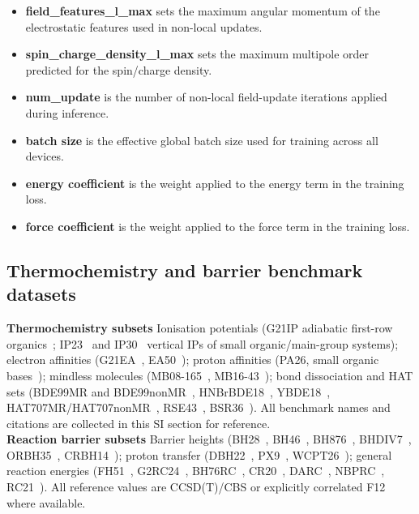 \documentclass[aps,%
superscriptaddress,
 amsmath,amssymb,
floatfix,
twocolumn
]{revtex4-2}
\begin{document}
\begin{itemize}
  \item \textbf{field\_features\_l\_max} sets the maximum angular momentum of the electrostatic features used in non-local updates.
  \item \textbf{spin\_charge\_density\_l\_max} sets the maximum multipole order predicted for the spin/charge density.
  \item \textbf{num\_update} is the number of non-local field-update iterations applied during inference.
  \item \textbf{batch size} is the effective global batch size used for training across all devices.
  \item \textbf{energy coefficient} is the weight applied to the energy term in the training loss.
  \item \textbf{force coefficient} is the weight applied to the force term in the training loss.
\end{itemize}
\subsection{Thermochemistry and barrier benchmark datasets}
\label{sec:tc_benchmarks}
\textbf{Thermochemistry subsets}  Ionisation potentials (G21IP adiabatic first-row organics~\cite{Parthiban2001}; IP23~\cite{Cheng2007} and IP30~\cite{Luo2012} vertical IPs of small organic/main-group systems); electron affinities (G21EA~\cite{Parthiban2001}, EA50~\cite{Ermis2021}); proton affinities (PA26, small organic bases~\cite{Parthiban2001}); mindless molecules (MB08-165~\cite{korth2009mindless}, MB16-43~\cite{Goerigk2017}); bond dissociation and HAT sets (BDE99MR and BDE99nonMR~\cite{Chan2017}, HNBrBDE18~\cite{Chan2018}, YBDE18~\cite{Zhao2012}, HAT707MR/HAT707nonMR~\cite{Karton2017HAT}, RSE43~\cite{Zhao2012RSE}, BSR36~\cite{Chan2016BSR}). All benchmark names and citations are collected in this SI section for reference. \\
\textbf{Reaction barrier subsets} Barrier heights (BH28~\cite{Liang2025}, BH46~\cite{Zhao2008BH76}, BH876~\cite{Prasad2021}, BHDIV7~\cite{Goerigk2017}, ORBH35~\cite{Chan2018}, CRBH14~\cite{Yu2015CRBH}); proton transfer (DBH22~\cite{Karton2008DBH}, PX9~\cite{Karton2012PX}, WCPT26~\cite{Karton2012WCPT}); general reaction energies (FH51~\cite{Friedrich_2015}, G2RC24~\cite{curtiss1991gaussian}, BH76RC~\cite{Goerigk2017}, CR20~\cite{yu2016can}, DARC~\cite{Goerigk2017}, NBPRC~\cite{goerigk2010general}, RC21~\cite{goerigk2010general}). All reference values are CCSD(T)/CBS or explicitly correlated F12 where available.
\end{document}
